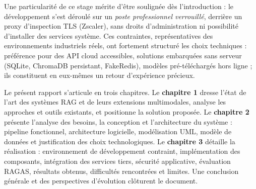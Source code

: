 Une particularité de ce stage mérite d'être soulignée dès l'introduction : le développement
s'est déroulé sur un \emph{poste professionnel verrouillé}, derrière un proxy d'inspection
TLS (Zscaler), sans droits d'administration ni possibilité d'installer des services
système. Ces contraintes, représentatives des environnements industriels réels, ont
fortement structuré les choix techniques : préférence pour des API cloud accessibles,
solutions embarquées sans serveur (SQLite, ChromaDB persistant, FakeRedis), modèles
pré-téléchargés hors ligne ; ils constituent en eux-mêmes un retour d'expérience précieux.

Le présent rapport s'articule en trois chapitres. Le \textbf{chapitre 1} dresse l'état de
l'art des systèmes RAG et de leurs extensions multimodales, analyse les approches et outils
existants, et positionne la solution proposée. Le \textbf{chapitre 2} présente l'analyse
des besoins, la conception et l'architecture du système : pipeline fonctionnel,
architecture logicielle, modélisation UML, modèle de données et justification des choix
technologiques. Le \textbf{chapitre 3} détaille la réalisation : environnement de
développement contraint, implémentation des composants, intégration des services tiers,
sécurité applicative, évaluation RAGAS, résultats obtenus, difficultés rencontrées et
limites. Une conclusion générale et des perspectives d'évolution clôturent le document.
